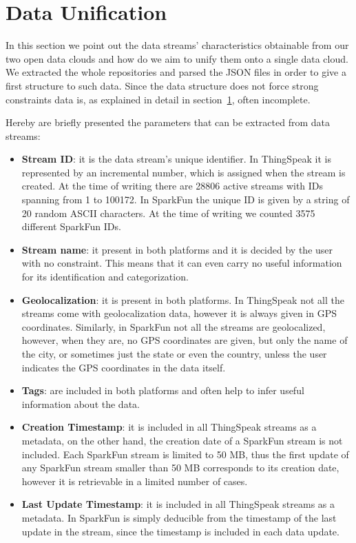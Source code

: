 \section{Data Unification}
\label{sec:unification}
In this section we point out the data streams' characteristics obtainable from our two open data clouds and how do we aim to unify them onto a single data cloud.
We extracted the whole repositories and parsed the JSON files in order to give a first structure to such data.
Since the data structure does not force strong constraints data is, as explained in detail in section~\ref{sec:unification}, often incomplete.

Hereby are briefly presented the parameters that can be extracted from data streams:
\begin{itemize}
 \item \textbf{Stream ID}: it is the data stream's unique identifier. In ThingSpeak it is represented by an incremental number, which is assigned when the stream is created. At the time of writing there are 28806 active streams with IDs spanning from 1 to 100172. In SparkFun the unique ID is given by a string of 20 random ASCII characters. At the time of writing we counted 3575 different SparkFun IDs. 
 \item \textbf{Stream name}: it present in both platforms and it is decided by the user with no constraint. This means that it can even carry no useful information for its identification and categorization.
 \item \textbf{Geolocalization}: it is present in both platforms. In ThingSpeak not all the streams come with geolocalization data, however it is always given in GPS coordinates. Similarly, in SparkFun not all the streams are geolocalized, however, when they are, no GPS coordinates are given, but only the name of the city, or sometimes just the state or even the country, unless the user indicates the GPS coordinates in the data itself.
 \item \textbf{Tags}: are included in both platforms and often help to infer useful information about the data.
 \item \textbf{Creation Timestamp}: it is included in all ThingSpeak streams as a metadata, on the other hand, the creation date of a SparkFun stream is not included. Each SparkFun stream is limited to 50 MB, thus the first update of any SparkFun stream smaller than 50 MB corresponds to its creation date,  however it is retrievable in a limited number of cases.
 \item \textbf{Last Update Timestamp}: it is included in all ThingSpeak streams as a metadata. In SparkFun is simply deducible from the timestamp of the last update in the stream, since the timestamp is included in each data update.

\end{itemize}
